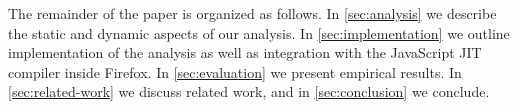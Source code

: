 
The remainder of the paper is organized as follows. In \Section\ref{sec:analysis}
we describe the static and dynamic aspects of our
analysis. In \Section\ref{sec:implementation} we outline implementation of the
analysis as well as integration with the JavaScript JIT compiler inside
Firefox. In \Section\ref{sec:evaluation} we present empirical
results. In \Section\ref{sec:related-work} we discuss related work, and in
\Section\ref{sec:conclusion} we conclude.


